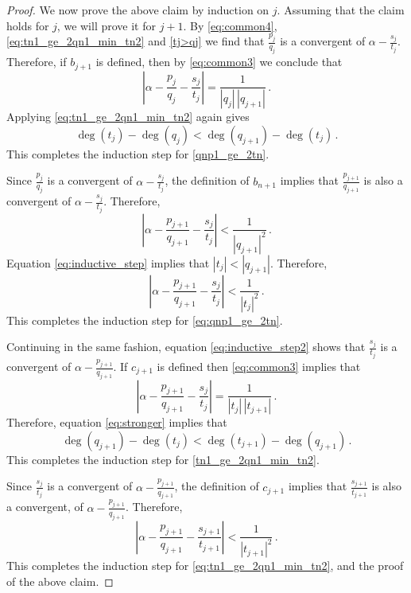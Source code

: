 \documentclass[a4paper,12pt]{article}
\begin{document}
\begin{proof}
We now prove the above claim by induction on $j$. Assuming that the claim holds for $j$, we will prove it for $j+1$. By \eqref{eq:common4}, \eqref{eq:tn1_ge_2qn1_min_tn2} and \eqref{tj>qj} we find that $\frac{p_j}{q_j}$ is a convergent of $\alpha-\frac{s_j}{t_j}$. Therefore, if $b_{j+1}$ is defined, then by \eqref{eq:common3} we conclude that 
$$
    \left|\alpha - \frac{p_j}{q_j} - \frac{s_j}{t_j}\right| = \frac{1}{|q_j|\,|q_{j+1}|}\,.
$$
Applying \eqref{eq:tn1_ge_2qn1_min_tn2} again gives 
\begin{equation}\label{eq:inductive_step}
    \deg(t_{j})-\deg(q_j)<\deg(q_{j+1})-\deg(t_{j})\,.
\end{equation}
This completes the induction step for \eqref{qnp1_ge_2tn}. 

Since $\frac{p_j}{q_j}$ is a convergent of $\alpha-\frac{s_j}{t_j}$, the definition of $b_{n+1}$ implies that $\frac{p_{j+1}}{q_{j+1}}$ is also a convergent of $\alpha-\frac{s_j}{t_j}$. Therefore, 
\begin{equation}\label{eq:stronger}
    \left|\alpha - \frac{p_{j+1}}{q_{j+1}} - \frac{s_j}{t_j}\right| < \frac{1}{|q_{j+1}|^2}\,.
\end{equation}
Equation \eqref{eq:inductive_step} implies that $|t_j|<|q_{j+1}|$. Therefore, 
\begin{equation}\label{eq:inductive_step2}
    \left|\alpha - \frac{p_{j+1}}{q_{j+1}} - \frac{s_j}{t_j}\right| < \frac{1}{|t_{j}|^2}\,.
\end{equation}
This completes the induction step for \eqref{eq:qnp1_ge_2tn}.

Continuing in the same fashion, equation \eqref{eq:inductive_step2} shows that $\frac{s_j}{t_j}$ is a convergent of $\alpha - \frac{p_{j+1}}{q_{j+1}}$. If $c_{j+1}$ is defined then \eqref{eq:common3} implies that 
$$
    \left|\alpha - \frac{p_{j+1}}{q_{j+1}} - \frac{s_j}{t_j}\right| = \frac{1}{|t_j|\,|t_{j+1}|}\,.
$$
Therefore, equation \eqref{eq:stronger} implies that
\begin{equation*}
    \deg(q_{j+1})-\deg(t_{j}) < \deg(t_{j+1})-\deg(q_{j+1})\,.
\end{equation*}
This completes the induction step for \eqref{tn1_ge_2qn1_min_tn2}.

Since $\frac{s_j}{t_j}$ is a convergent of $\alpha-\frac{p_{j+1}}{q_{j+1}}$, the definition of $c_{j+1}$ implies that $\frac{s_{j+1}}{t_{j+1}}$ is also a convergent, of $\alpha-\frac{p_{j+1}}{q_{j+1}}$. Therefore, 
\begin{equation*}
\left|\alpha - \frac{p_{j+1}}{q_{j+1}} - \frac{s_{j+1}}{t_{j+1}}\right| < \frac{1}{|t_{j+1}|^2}\,.
\end{equation*}
This completes the induction step for \eqref{eq:tn1_ge_2qn1_min_tn2}, and the proof of the above claim.


\end{proof}
\end{document}
